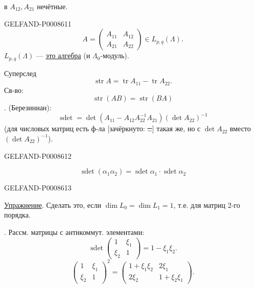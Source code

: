 в \(A_{12},A_{21}\) нечётные.


\begin{GelfandAdjacentEvidence}{GELFAND-P000861}{1}
\[
A=\begin{pmatrix}A_{11}&A_{12}\\A_{21}&A_{22}\end{pmatrix}\in L_{p,q}(\Lambda).
\]
\(L_{p,q}(\Lambda)\) — \uline{это алгебра} (и \(\Lambda_0\)-модуль).

Суперслед
\[
\operatorname{str} A=\operatorname{tr} A_{11}-\operatorname{tr} A_{22}.\tag{5}
\]
Св-во:
\[
\operatorname{str}(AB)=\operatorname{str}(BA)\tag{6}
\]
. (Березиниан):
\[
\operatorname{sdet}=\det(A_{11}-A_{12}A_{22}^{-1}A_{21})(\det A_{22})^{-1}\tag{7}
\]
(для числовых матриц есть ф-ла [зачёркнуто: \sout{…}] такая же, но с
\(\det A_{22}\) вместо \((\det A_{22})^{-1}\)).
\end{GelfandAdjacentEvidence}
\begin{GelfandAdjacentEvidence}{GELFAND-P000861}{2}

\[
\operatorname{sdet}(\alpha_1\alpha_2)=
\operatorname{sdet}\alpha_1\cdot\operatorname{sdet}\alpha_2\tag{8}
\]
\end{GelfandAdjacentEvidence}
\begin{GelfandAdjacentEvidence}{GELFAND-P000861}{3}


\uline{Упражнение}. Сделать это, если \(\dim L_0=\dim L_1=1\), т.е. для матриц 2-го порядка.

. Рассм. матрицы с антикоммут. элементами:
\[
\operatorname{sdet}\begin{pmatrix}1&\xi_1\\\xi_2&1\end{pmatrix}
 =1-\xi_1\xi_2.
\]
\[
\begin{pmatrix}1&\xi_1\\\xi_2&1\end{pmatrix}^{2}
=\begin{pmatrix}1+\xi_1\xi_2&2\xi_1\\2\xi_2&1+\xi_2\xi_1\end{pmatrix}.
\]
\end{GelfandAdjacentEvidence}

